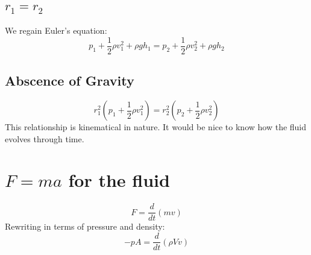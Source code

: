 \documentclass[9pt]{article}
\begin{document}
\subsection{$r_1 = r_2$}
We regain Euler's equation:
\[
  p_1 + \frac{1}{2} \rho v_1^2  + \rho g h_1 = p_2 + \frac{1}{2} \rho v_2^2 + \rho g h_2
\]
\subsection{Abscence of Gravity}
\[
  r_1^2 (p_1 + \frac{1}{2} \rho v_1^2 ) = r_2^2 (p_2 + \frac{1}{2} \rho v_2^2 )
\]
This relationship is kinematical in nature. It would be nice to know how the
fluid evolves through time.
\section{$F = ma$ for the fluid}
\[
  F = \frac{d}{dt} (m v)
\]
Rewriting in terms of pressure and density:
\[
  - p A = \frac{d}{dt} (\rho V v)
\]
\end{document}
